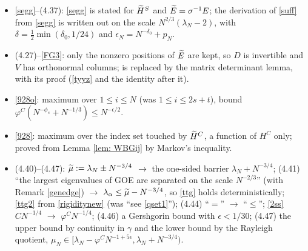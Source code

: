 \begin{itemize}
\item \eqref{segg}--(4.37): \eqref{segg} is stated for $\widetilde H^S$ and $\widetilde E=\sigma^{-1}E$; the derivation of \eqref{suff} from \eqref{segg} is written out on the scale $N^{2/3}(\lambda_N-2)$, with $\delta=\frac12\min(\delta_0,1/24)$ and $\epsilon_N=N^{-\delta_0}+p_N$.
\item (4.27)--\eqref{FG3}: only the nonzero positions of $\widetilde E$ are kept, so $D$ is invertible and $V$ has orthonormal columns; \cite[Lemma 6.1]{KY} is replaced by the matrix determinant lemma, with its proof (\eqref{tyyz} and the identity after it).
\item \eqref{928o}: maximum over $1\le i\le N$ (was $1\le i\le 2s+t$), bound $\varphi^C(N^{-\phi_s}+N^{-1/3})\le N^{-\epsilon/2}$.
\item \eqref{928}: maximum over the index set touched by $\widetilde H^C$, a function of $H^C$ only; proved from Lemma \ref{lem: WBGij} by Markov's inequality.
\item (4.40)--(4.47): $\widetilde\mu:=\lambda_N\pm N^{-3/4}$ $\to$ the one-sided barrier $\lambda_N+N^{-3/4}$; (4.41) ``the largest eigenvalues of GOE are separated on the scale $N^{-2/3}$'' (with Remark \ref{genedge}) $\to$ $\lambda_\alpha\le\widetilde\mu-N^{-3/4}$, so \eqref{ttg} holds deterministically; \eqref{ttg2} from \eqref{rigiditynew} (was ``see \eqref{qset1}''); (4.44) ``$=$'' $\to$ ``$\le$''; \eqref{2ss} $CN^{-1/4}$ $\to$ $\varphi^CN^{-1/4}$; (4.46) a Gershgorin bound with $\epsilon<1/30$; (4.47) the upper bound by continuity in $\gamma$ and the lower bound by the Rayleigh quotient, $\mu_N\in[\lambda_N-\varphi^CN^{-1+5\epsilon},\lambda_N+N^{-3/4})$.
\end{itemize}

